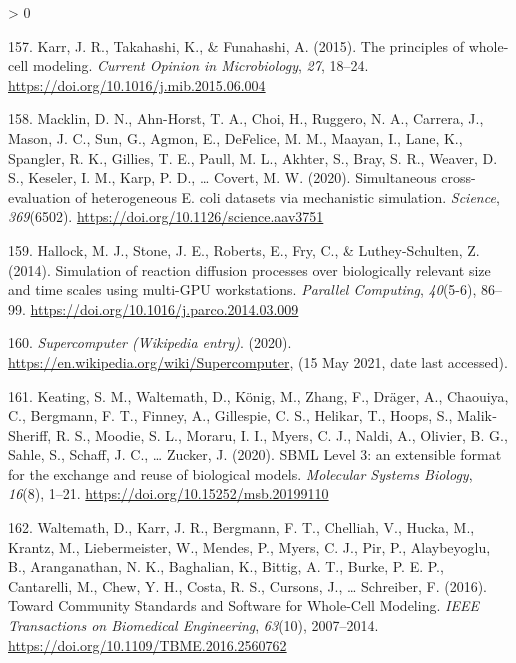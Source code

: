 \documentclass[
  12pt,
]{book}
\newlength{\cslhangindent}
\newenvironment{CSLReferences}[2] %
 {%
  \setlength{\parindent}{0pt}
  \ifodd #1 \everypar{\setlength{\hangindent}{\cslhangindent}}\ignorespaces\fi
  \ifnum #2 > 0
  \setlength{\parskip}{#2\baselineskip}
  \fi
 }%
 {}
\begin{document}
\begin{CSLReferences}{1}{0}
\leavevmode\hypertarget{ref-Karr2015}{}%
157. Karr, J. R., Takahashi, K., \& Funahashi, A. (2015). {The principles of whole-cell modeling}. \emph{Current Opinion in Microbiology}, \emph{27}, 18--24. \url{https://doi.org/10.1016/j.mib.2015.06.004}

\leavevmode\hypertarget{ref-Macklin2020}{}%
158. Macklin, D. N., Ahn-Horst, T. A., Choi, H., Ruggero, N. A., Carrera, J., Mason, J. C., Sun, G., Agmon, E., DeFelice, M. M., Maayan, I., Lane, K., Spangler, R. K., Gillies, T. E., Paull, M. L., Akhter, S., Bray, S. R., Weaver, D. S., Keseler, I. M., Karp, P. D., \ldots{} Covert, M. W. (2020). {Simultaneous cross-evaluation of heterogeneous E. coli datasets via mechanistic simulation}. \emph{Science}, \emph{369}(6502). \url{https://doi.org/10.1126/science.aav3751}

\leavevmode\hypertarget{ref-Hallock2014}{}%
159. Hallock, M. J., Stone, J. E., Roberts, E., Fry, C., \& Luthey-Schulten, Z. (2014). {Simulation of reaction diffusion processes over biologically relevant size and time scales using multi-GPU workstations}. \emph{Parallel Computing}, \emph{40}(5-6), 86--99. \url{https://doi.org/10.1016/j.parco.2014.03.009}

\leavevmode\hypertarget{ref-HPC-wiki}{}%
160. \emph{{Supercomputer (Wikipedia entry)}}. (2020). \url{https://en.wikipedia.org/wiki/Supercomputer}, (15 May 2021, date last accessed).

\leavevmode\hypertarget{ref-Keating2020}{}%
161. Keating, S. M., Waltemath, D., König, M., Zhang, F., Dräger, A., Chaouiya, C., Bergmann, F. T., Finney, A., Gillespie, C. S., Helikar, T., Hoops, S., Malik‐Sheriff, R. S., Moodie, S. L., Moraru, I. I., Myers, C. J., Naldi, A., Olivier, B. G., Sahle, S., Schaff, J. C., \ldots{} Zucker, J. (2020). {SBML Level 3: an extensible format for the exchange and reuse of biological models}. \emph{Molecular Systems Biology}, \emph{16}(8), 1--21. \url{https://doi.org/10.15252/msb.20199110}

\leavevmode\hypertarget{ref-Waltemath2016}{}%
162. Waltemath, D., Karr, J. R., Bergmann, F. T., Chelliah, V., Hucka, M., Krantz, M., Liebermeister, W., Mendes, P., Myers, C. J., Pir, P., Alaybeyoglu, B., Aranganathan, N. K., Baghalian, K., Bittig, A. T., Burke, P. E. P., Cantarelli, M., Chew, Y. H., Costa, R. S., Cursons, J., \ldots{} Schreiber, F. (2016). {Toward Community Standards and Software for Whole-Cell Modeling}. \emph{IEEE Transactions on Biomedical Engineering}, \emph{63}(10), 2007--2014. \url{https://doi.org/10.1109/TBME.2016.2560762}


\end{CSLReferences}
\end{document}
